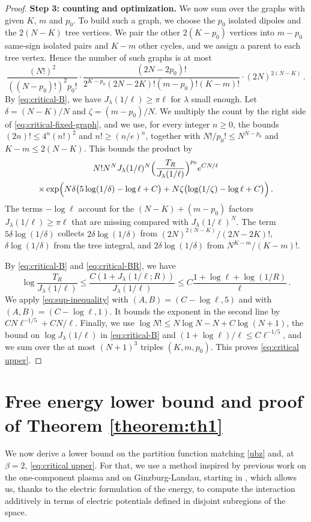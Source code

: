 \documentclass[a4paper,10pt,leqno]{amsart}
\numberwithin{equation}{section}
\begin{document}
\begin{proof}
  \smallskip
  \noindent
  \textbf{Step 3: counting and optimization.}
  We now sum over the graphs with given $K$, $m$ and $p_0$. To build such a graph, we choose the $p_0$ isolated dipoles and the $2(N-K)$ tree vertices. We pair the other $2(K-p_0)$ vertices into $m-p_0$ same-sign isolated pairs and $K-m$ other cycles, and we assign a parent to each tree vertex. Hence the number of such graphs is at most
  \[
    \frac{(N!)^2}{((N-p_0)!)^2p_0!}\cdot\frac{(2N-2p_0)!}{2^{K-p_0}(2N-2K)!(m-p_0)!(K-m)!}\cdot(2N)^{2(N-K)}\,.
  \]
  By \eqref{eq:critical-B}, we have $J_\lambda(1/\ell)\ge\pi\ell$ for $\lambda$ small enough. Let $\delta=(N-K)/N$ and $\zeta=(m-p_0)/N$. We multiply the count by the right side of \eqref{eq:critical-fixed-graph}, and we use, for every integer $n\ge0$, the bounds $(2n)!\le4^n(n!)^2$ and $n!\ge(n/e)^n$, together with $N!/p_0!\le N^{N-p_0}$ and $K-m\le2(N-K)$. This bounds the product by
  \begin{multline*}
    N!N^NJ_\lambda(1/\ell)^N\Bigl(\frac{T_R}{J_\lambda(1/\ell)}\Bigr)^{p_0}e^{CN/\ell}\\
    \times\exp\Bigl(N\delta\bigl(5\log(1/\delta)-\log\ell+C\bigr)+N\zeta\bigl(\log(1/\zeta)-\log\ell+C\bigr)\Bigr)\,.
  \end{multline*}
  The terms $-\log\ell$ account for the $(N-K)+(m-p_0)$ factors $J_\lambda(1/\ell)\ge\pi\ell$ that are missing compared with $J_\lambda(1/\ell)^N$. The term $5\delta\log(1/\delta)$ collects $2\delta\log(1/\delta)$ from $(2N)^{2(N-K)}/(2N-2K)!$, $\delta\log(1/\delta)$ from the tree integral, and $2\delta\log(1/\delta)$ from $N^{K-m}/(K-m)!$.

  By \eqref{eq:critical-B} and \eqref{eq:critical-BR}, we have
  \[
    \log\frac{T_R}{J_\lambda(1/\ell)}\le\frac{C(1+J_\lambda(1/\ell;R))}{J_\lambda(1/\ell)}\le C\frac{1+\log\ell+\log(1/R)}{\ell}\,.
  \]
  We apply \eqref{eq:sup-inequality} with $(A,B)=(C-\log\ell,5)$ and with $(A,B)=(C-\log\ell,1)$. It bounds the exponent in the second line by $CN\ell^{-1/5}+CN/\ell$. Finally, we use $\log N!\le N\log N-N+C\log(N+1)$, the bound on $\log J_\lambda(1/\ell)$ in \eqref{eq:critical-B} and $(1+\log\ell)/\ell\le C\ell^{-1/5}$, and we sum over the at most $(N+1)^3$ triples $(K,m,p_0)$. This proves \eqref{eq:critical upper}.
\end{proof}

\section{Free energy lower bound and proof of Theorem \ref{theorem:th1}}\label{sec4}
We now derive a lower bound on the partition function matching \eqref{ubz} and, at $\beta=2$, \eqref{eq:critical upper}. For that, we use a method inspired by previous work on the one-component plasma and on Ginzburg-Landau, starting in \cite{gl13,SS2d}, which allows us, thanks to the electric formulation of the energy, to compute the interaction additively in terms of electric potentials defined in disjoint subregions of the space.
\end{document}
